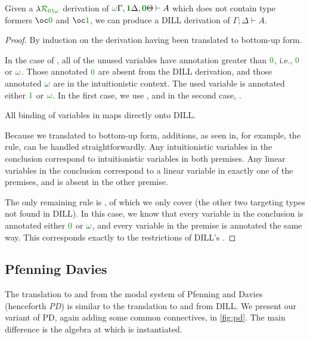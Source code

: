 \documentclass[submission,copyright,creativecommons]{eptcs}
\begin{document}
\begin{proposition}
  Given a $\name_{\instDILL}$ derivation of
  $\ctx{\Gamma}{\vct\unrestricted}, \ctx{\Delta}{\vct\linear},
  \ctx{\Theta}{\vct\zero} \vdash A$ which does not contain type formers
  $\excl 0$ and $\excl 1$, we can produce a DILL derivation of
  $\Gamma; \Delta \vdash A$.
\end{proposition}
\begin{proof}
  By induction on the derivation having been translated to bottom-up form.

  In the case of , all of the unused variables have annotation
  greater than $\zero$, i.e., $\zero$ or $\unrestricted$.
  Those annotated $\zero$ are absent from the DILL derivation, and those
  annotated $\unrestricted$ are in the intuitionistic context.
  The used variable is annotated either $\linear$ or $\unrestricted$.
  In the first case, we use , and in the second case,
  .

  All binding of variables in \name{} maps directly onto DILL.

  Because we translated to bottom-up form, additions, as seen in, for example,
  the  rule, can be handled straightforwardly.
  Any intuitionistic variables in the conclusion correspond to intuitionistic
  variables in both premises.
  Any linear variables in the conclusion correspond to a linear variable in
  exactly one of the premises, and is absent in the other premise.

  The only remaining rule is , of which we only cover
   (the other two targeting types not found
  in DILL).
  In this case, we know that every variable in the conclusion is annotated
  either $\zero$ or $\unrestricted$, and every variable in the premise is
  annotated the same way.
  This corresponds exactly to the restrictions of DILL's .
\end{proof}

\subsection{Pfenning Davies}\label{sec:pd}

The translation to and from the modal system of Pfenning and Davies
\cite{judgmental} (henceforth \emph{PD}) is similar to the translation to and
from DILL.
We present our variant of PD, again adding some common connectives, in
\autoref{fig:pd}.
The main difference is the algebra at which \name{} is instantiated.
\end{document}
